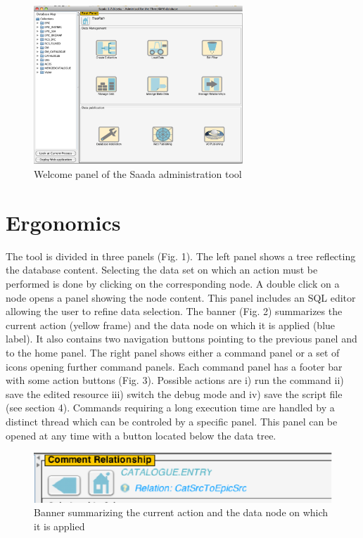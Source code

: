 \begin{figure}[!h]
	\begin{center}
		\includegraphics[width=0.70\textwidth]{part8/MICHEL_P18/P18_fig1.eps}
	\end{center}
	\caption{Welcome panel of the Saada administration tool}
	\label{fig:fig1}
\end{figure}

\section{Ergonomics}
The tool is divided in three panels (Fig. 1). The left panel shows a tree reflecting the database content. Selecting the data set on which an action must be performed is done by clicking on the corresponding node.
A double click on a node opens a panel showing the node content. This panel includes an SQL editor allowing the user to refine data selection. The banner (Fig. 2)  summarizes the current action (yellow frame) and the data node on which it is applied (blue label). It also contains two navigation buttons pointing to the previous panel and to the home panel. The right panel shows either a command panel or a set of icons opening further command panels. Each command panel has a footer bar with some action buttons (Fig. 3). Possible actions are i) run the command ii) save the edited resource iii) switch the debug mode and iv) save the script file (see section 4). Commands requiring a long execution time are handled by a distinct thread which can be controled by a specific panel. This panel can be opened at any time with a button located below the data tree.

\begin{figure}[!h]
	\begin{center}
		\includegraphics[height=0.10\textwidth]{part8/MICHEL_P18/P18_fig2.eps}
	\end{center}
	\caption{Banner summarizing the current action and the data node on which it is applied}
	\label{fig:fig2}
\end{figure}

